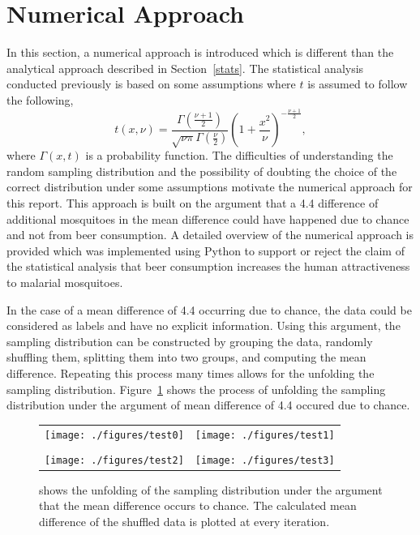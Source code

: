 \section{Numerical Approach}\label{computational}
In this section, a numerical approach is introduced which is different than the analytical approach described in Section~\ref{stats}. The statistical analysis conducted previously is based on some assumptions where $t$ is assumed to follow the following,
\begin{equation*}
  t(x,\nu) = \frac{\Gamma(\frac{\nu+1}{2})}{\sqrt{\nu\pi}\Gamma(\frac{\nu}{2})}\left(1 +\frac{x^2}{\nu} \right)^{-\frac{\nu+1}{2}},
\end{equation*}
where $\Gamma(x,t)$ is a probability function. The difficulties of understanding the random sampling distribution and the possibility of doubting the choice of the correct distribution under some assumptions motivate the numerical approach for this report. This approach is built on the argument that a 4.4 difference of additional mosquitoes in the mean difference could have happened due to chance and not from beer consumption. A detailed overview of the numerical approach is provided which was implemented using Python to support or reject the claim of the statistical analysis that beer consumption increases the human attractiveness to malarial mosquitoes.

In the case of a mean difference of 4.4 occurring due to chance, the data could be considered as labels and have no explicit information. Using this argument, the sampling distribution can be constructed by grouping the data, randomly shuffling them, splitting them into two groups, and computing the mean difference. Repeating this process many times allows for the unfolding  the sampling distribution. Figure~\ref{unfold} shows the process of unfolding the sampling distribution under the argument of mean difference of 4.4 occured due to chance.
\begin{figure}
  \centering
  \begin{tabular}{cc}
    \texttt{[image: ./figures/test0]} & \texttt{[image: ./figures/test1]} \\
     & \\
    \texttt{[image: ./figures/test2]} & \texttt{[image: ./figures/test3]} \\
  \end{tabular}
  \caption{shows the unfolding of the sampling distribution under the argument that the mean difference occurs to chance. The calculated mean difference of the shuffled data is plotted at every iteration.}\label{unfold}
\end{figure}

